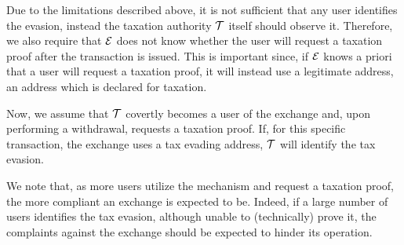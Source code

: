 Due to the limitations described above, it is not sufficient that any user
identifies the evasion, instead the taxation authority $\mathcal{T}$ itself should
observe it. Therefore, we also require that $\mathcal{E}$ does not know whether
the user will request a taxation proof after the transaction is issued. This is
important since, if $\mathcal{E}$ knows a priori that a user will request a
taxation proof, it will instead use a legitimate address, \ie an address which
is declared for taxation.

Now, we assume that $\mathcal{T}$ covertly becomes a user of the exchange and,
upon performing a withdrawal, requests a taxation proof. If, for this specific
transaction, the exchange uses a tax evading address, $\mathcal{T}$ will identify
the tax evasion.

We note that, as more users utilize the mechanism and request a taxation proof,
the more compliant an exchange is expected to be. Indeed, if a large number of
users identifies the tax evasion, although unable to (technically) prove it,
the complaints against the exchange should be expected to hinder its operation.
